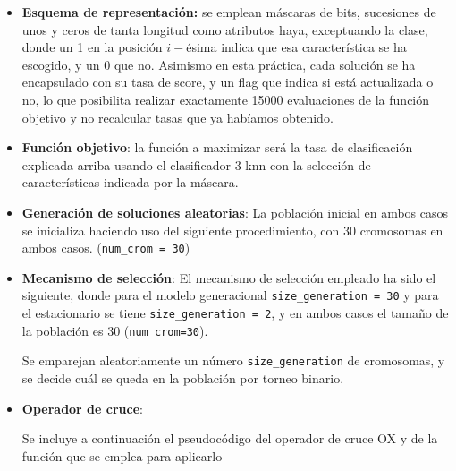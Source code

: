 \documentclass[a4paper,11pt]{article}
\begin{document}
\begin{itemize} 
\item \textbf{Esquema de representación:} se emplean máscaras de bits, sucesiones de unos y ceros de tanta longitud como atributos haya,
exceptuando la clase, donde un 1 en la posición $i-$ésima indica que esa característica se ha escogido, y un $0$ que no.
Asimismo en esta práctica, cada solución se ha encapsulado con su tasa de score, y un flag que indica si está actualizada o
no, lo que posibilita realizar exactamente 15000 evaluaciones de la función objetivo y no recalcular tasas que ya habíamos
obtenido.

\item \textbf{Función objetivo}: la función a maximizar será la tasa de clasificación explicada arriba usando el clasificador
3-knn con la selección de características indicada por la máscara.\\

  \small\texttt{}
  \normalsize
  
\item \textbf{Generación de soluciones aleatorias}:
  La población inicial en ambos casos se inicializa haciendo uso del siguiente procedimiento, con 30 cromosomas en ambos casos.
  (\texttt{num\_crom = 30})\\
  
  \small\texttt{}
  \normalsize

\item \textbf{Mecanismo de selección}:
  El mecanismo de selección empleado ha sido el siguiente, donde para el modelo generacional \texttt{size\_generation = 30} y para
  el estacionario se tiene \texttt{size\_generation = 2}, y en ambos casos el tamaño de la población es 30 (\texttt{num\_crom=30}).

  Se emparejan aleatoriamente un número \texttt{size\_generation} de cromosomas, y se decide cuál se queda en la población por
  torneo binario.\\
  
  \small\texttt{}
  \normalsize
  
  
\item \textbf{Operador de cruce}:

  Se incluye a continuación el pseudocódigo del operador de cruce OX y de la función que se emplea para aplicarlo\\

  \small\texttt{}
  \normalsize


\end{itemize}
\end{document}
